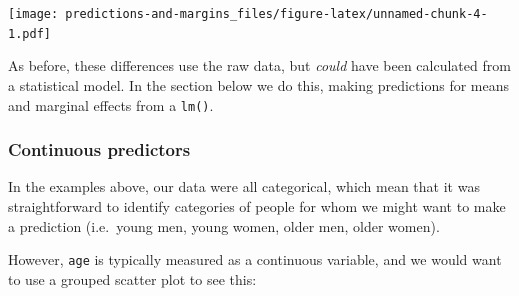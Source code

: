 \documentclass[]{article}
\newenvironment{Shaded}{\begin{snugshade}}{\end{snugshade}}
\newcommand{\KeywordTok}[1]{\textcolor[rgb]{0.13,0.29,0.53}{\textbf{#1}}}
\newcommand{\DataTypeTok}[1]{\textcolor[rgb]{0.13,0.29,0.53}{#1}}
\newcommand{\DecValTok}[1]{\textcolor[rgb]{0.00,0.00,0.81}{#1}}
\newcommand{\StringTok}[1]{\textcolor[rgb]{0.31,0.60,0.02}{#1}}
\newcommand{\CommentTok}[1]{\textcolor[rgb]{0.56,0.35,0.01}{\textit{#1}}}
\newcommand{\OperatorTok}[1]{\textcolor[rgb]{0.81,0.36,0.00}{\textbf{#1}}}
\newcommand{\NormalTok}[1]{#1}
\theoremstyle{definition}
\theoremstyle{definition}
\theoremstyle{definition}
\theoremstyle{remark}
\begin{document}
\begin{Shaded}
\end{Shaded}

\texttt{[image: predictions-and-margins\_files/figure-latex/unnamed-chunk-4-1.pdf]}

As before, these differences use the raw data, but \emph{could} have
been calculated from a statistical model. In the section below we do
this, making predictions for means and marginal effects from a
\texttt{lm()}.

\subsubsection*{Continuous predictors}\label{continuous-predictors-1}

In the examples above, our data were all categorical, which mean that it
was straightforward to identify categories of people for whom we might
want to make a prediction (i.e.~young men, young women, older men, older
women).

However, \texttt{age} is typically measured as a continuous variable,
and we would want to use a grouped scatter plot to see this:
\end{document}
